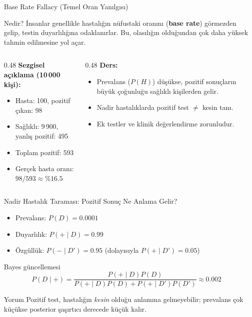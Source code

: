 \documentclass[light]{lutbeamer}
\begin{document}
\begin{frame}{Base Rate Fallacy (Temel Oran Yanılgısı)}
    \begin{block}{Nedir?}
        İnsanlar genellikle hastalığın nüfustaki oranını (\textbf{base rate}) görmezden gelip, testin duyarlılığına odaklanırlar. Bu, olasılığın olduğundan çok daha yüksek tahmin edilmesine yol açar.
    \end{block}

    \begin{columns}[T]
        \begin{column}{0.48\textwidth}
            \textbf{Sezgisel açıklama (10\,000 kişi):}
            \begin{itemize}
                \item Hasta: 100, pozitif çıkan: 98
                \item Sağlıklı: 9\,900, yanlış pozitif: 495
                \item Toplam pozitif: 593
                \item Gerçek hasta oranı: $98/593 \approx \%16.5$
            \end{itemize}
        \end{column}
        \begin{column}{0.48\textwidth}
            \textbf{Ders:}
            \begin{itemize}
                \item Prevalans ($P(H)$) düşükse, pozitif sonuçların büyük çoğunluğu sağlıklı kişilerden gelir.
                \item Nadir hastalıklarda pozitif test $\neq$ kesin tanı.
                \item Ek testler ve klinik değerlendirme zorunludur.
            \end{itemize}
        \end{column}
    \end{columns}
\end{frame}

\begin{frame}{Nadir Hastalık Taraması: Pozitif Sonuç Ne Anlama Gelir?}
    \small
    \begin{itemize}
        \item Prevalans: $P(D)=0.0001$
        \item Duyarlılık: $P(+\mid D)=0.99$
        \item Özgüllük: $P(-\mid D')=0.95$ \;\; (dolayısıyla $P(+\mid D')=0.05$)
    \end{itemize}

    \begin{alertblock}{Bayes güncellemesi}
        \[
        P(D\mid +)=\frac{P(+\mid D)P(D)}{P(+\mid D)P(D)+P(+\mid D')P(D')}
        \approx 0.002
        \]
    \end{alertblock}

    \begin{block}{Yorum}
        Pozitif test, hastalığın \emph{kesin} olduğu anlamına gelmeyebilir; prevalans çok küçükse posterior şaşırtıcı derecede küçük kalır.
    \end{block}
\end{frame}
\end{document}
